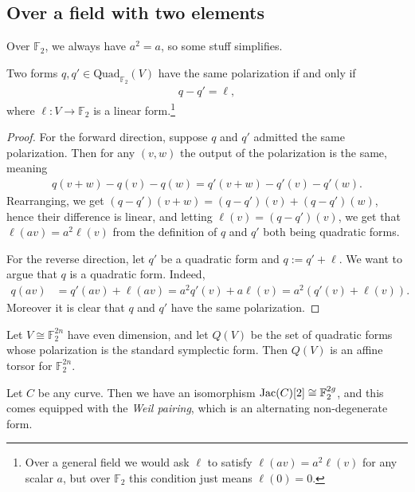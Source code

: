 \documentclass[11pt]{amsart}
\providecommand{\Quad}{\mathrm{Quad}}
\begin{document}
\subsection{Over a field with two elements}

Over $\mathbb{F}_2$, we always have $a^2 = a$, so some stuff simplifies.

\begin{proposition} Two forms $q,q' \in \Quad_{\mathbb{F}_2}(V)$ have the same polarization if and only if
\begin{align*}
    q - q' = \ell,
\end{align*}
where $\ell \colon V \to \mathbb{F}_2$ is a linear form.\footnote{Over a general field we would ask $\ell$ to satisfy $\ell(av) = a^2 \ell(v)$ for any scalar $a$, but over $\mathbb{F}_2$ this condition just means $\ell(0) = 0$.}
\end{proposition}
\begin{proof} For the forward direction, suppose $q$ and $q'$ admitted the same polarization. Then for any $(v,w)$ the output of the polarization is the same, meaning
\begin{align*}
    q(v+w) - q(v) - q(w) = q'(v+w) - q'(v) - q'(w).
\end{align*}
Rearranging, we get $(q-q')(v+w) = (q-q')(v) + (q-q')(w)$, hence their difference is linear, and letting $\ell(v) = (q-q')(v)$, we get that $\ell(av) = a^2 \ell(v)$ from the definition of $q$ and $q'$ both being quadratic forms.

For the reverse direction, let $q'$ be a quadratic form and $q := q' + \ell$. We want to argue that $q$ is a quadratic form. Indeed, 
\begin{align*}
    q(av) &= q'(av) + \ell(av) = a^2 q'(v) + a \ell(v) = a^2 (q'(v) + \ell(v)).
\end{align*}
Moreover it is clear that $q$ and $q'$ have the same polarization.
\end{proof}

\begin{proposition} Let $V\cong \mathbb{F}_2^{2n}$ have even dimension, and let $Q(V)$ be the set of quadratic forms whose polarization is the standard symplectic form. Then $Q(V)$ is an affine torsor for $\mathbb{F}_2^{2n}$.
\end{proposition}

\begin{example} Let $C$ be any curve. Then we have an isomorphism $\mathrm{Jac}(C)[2]\cong \mathbb{F}_2^{2g}$, and this comes equipped with the \textit{Weil pairing}, which is an alternating non-degenerate form.
\end{example}
\end{document}
